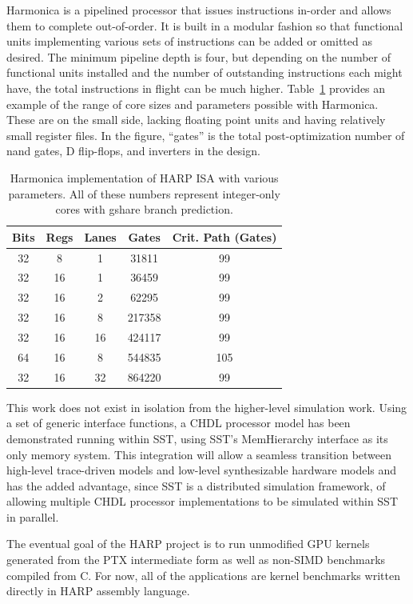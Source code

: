 Harmonica is a pipelined processor that issues instructions in-order and allows them to complete out-of-order.
It is built in a modular fashion so that functional units implementing various sets of instructions can be added or omitted as desired.
The minimum pipeline depth is four, but depending on the number of functional units installed and the number of outstanding instructions each might have, the total instructions in flight can be much higher.
Table~\ref{table:harp} provides an example of the range of core sizes and parameters possible with Harmonica.
These are on the small side, lacking floating point units and having relatively small register files.
In the figure, ``gates'' is the total post-optimization number of nand gates, D flip-flops, and inverters in the design.

\begin{table}
  \centering
  \begin{tabular}{ccc|cc}
    Bits&Regs&Lanes&  Gates& Crit. Path (Gates)\\
    \hline
    32  &   8&    1&  31811&           99\\
    32  &  16&    1&  36459&           99\\
    32  &  16&    2&  62295&           99\\
    32  &  16&    8& 217358&           99\\
    32  &  16&   16& 424117&           99\\
    64  &  16&    8& 544835&          105\\
    32  &  16&   32& 864220&           99\\
  \end{tabular}
  \caption{Harmonica implementation of HARP ISA with various parameters. All of these numbers represent integer-only cores with gshare branch prediction.}
  \label{table:harp}
\end{table}

This work does not exist in isolation from the higher-level simulation work.
Using a set of generic interface functions, a CHDL processor model has been demonstrated running within SST, using SST's MemHierarchy interface as its only memory system.
This integration will allow a seamless transition between high-level trace-driven models and low-level synthesizable hardware models and has the added advantage, since SST is a distributed simulation framework, of allowing multiple CHDL processor implementations to be simulated within SST in parallel.

The eventual goal of the HARP project is to run unmodified GPU kernels generated from the PTX intermediate form as well as non-SIMD benchmarks compiled from C.
For now, all of the applications are kernel benchmarks written directly in HARP assembly language.
